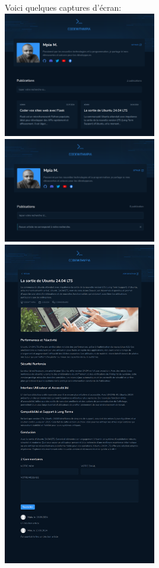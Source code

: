 \documentclass[a4paper,11pt]{article}
\begin{document}
                \newpage
                \noindent Voici quelques captures d'écran:\\
                \includegraphics[width=0.5\textwidth]{CHAPITRE-5/5.1-A-RENDRE/screenshots/screen2.png}
                \includegraphics[width=0.5\textwidth]{CHAPITRE-5/5.1-A-RENDRE/screenshots/screen3.png}
                \includegraphics[width=0.5\textwidth]{CHAPITRE-5/5.1-A-RENDRE/screenshots/screen4.png}
\end{document}

